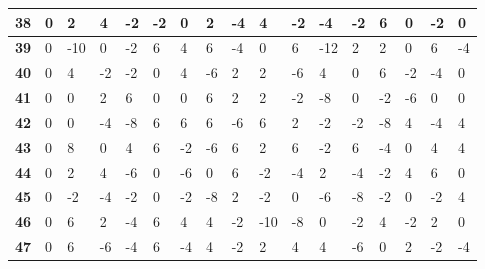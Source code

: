 \begin{longtable}[c]{|l|l|l|l|l|l|l|l|l|l|l|l|l|l|l|l|l|}
\textbf{38} & 0          & 2          & 4          & -2         & -2         & 0          & 2          & -4         & 4          & -2         & -4          & -2          & 6           & 0           & -2          & 0           \\ \hline
\textbf{39} & 0          & -10        & 0          & -2         & 6          & 4          & 6          & -4         & 0          & 6          & -12         & 2           & 2           & 0           & 6           & -4          \\ \hline
\textbf{40} & 0          & 4          & -2         & -2         & 0          & 4          & -6         & 2          & 2          & -6         & 4           & 0           & 6           & -2          & -4          & 0           \\ \hline
\textbf{41} & 0          & 0          & 2          & 6          & 0          & 0          & 6          & 2          & 2          & -2         & -8          & 0           & -2          & -6          & 0           & 0           \\ \hline
\textbf{42} & 0          & 0          & -4         & -8         & 6          & 6          & 6          & -6         & 6          & 2          & -2          & -2          & -8          & 4           & -4          & 4           \\ \hline
\textbf{43} & 0          & 8          & 0          & 4          & 6          & -2         & -6         & 6          & 2          & 6          & -2          & 6           & -4          & 0           & 4           & 4           \\ \hline
\textbf{44} & 0          & 2          & 4          & -6         & 0          & -6         & 0          & 6          & -2         & -4         & 2           & -4          & -2          & 4           & 6           & 0           \\ \hline
\textbf{45} & 0          & -2         & -4         & -2         & 0          & -2         & -8         & 2          & -2         & 0          & -6          & -8          & -2          & 0           & -2          & 4           \\ \hline
\textbf{46} & 0          & 6          & 2          & -4         & 6          & 4          & 4          & -2         & -10        & -8         & 0           & -2          & 4           & -2          & 2           & 0           \\ \hline
\textbf{47} & 0          & 6          & -6         & -4         & 6          & -4         & 4          & -2         & 2          & 4          & 4           & -6          & 0           & 2           & -2          & -4          \\ \hline

\end{longtable}

